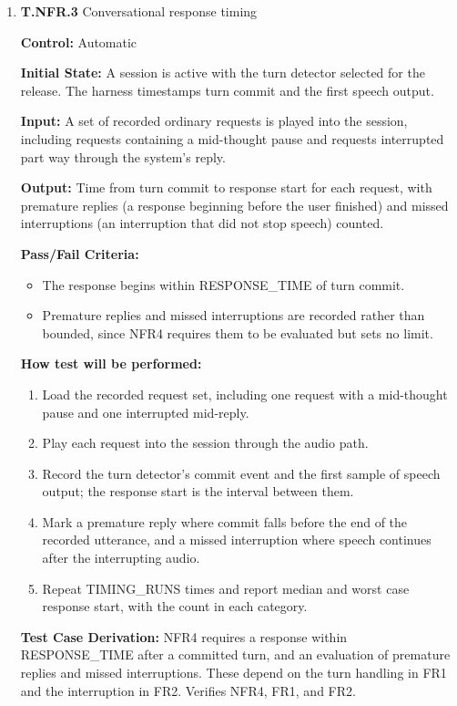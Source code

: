 \documentclass[12pt, titlepage]{article}
\begin{document}
\begin{enumerate}
\textbf{Test Case Derivation:} NFR3 requires a stop to be acknowledged within STOP\_ACK\_TIME, with the time to block new actions and the time to reconcile in-flight work measured separately. Verifies NFR3.


\item{\textbf{T.NFR.3} Conversational response timing\\}\label{test:T.NFR.3}

\textbf{Control:} Automatic

\textbf{Initial State:} A session is active with the turn detector selected for the release. The harness
timestamps turn commit and the first speech output.

\textbf{Input:} A set of recorded ordinary requests is played into the session, including requests
containing a mid-thought pause and requests interrupted part way through the system's reply.

\textbf{Output:} Time from turn commit to response start for each request, with premature replies
(a response beginning before the user finished) and missed interruptions (an interruption that did not stop
speech) counted.

\textbf{Pass/Fail Criteria:}
\begin{itemize}
  \item The response begins within RESPONSE\_TIME of turn commit.
  \item Premature replies and missed interruptions are recorded rather than bounded, since NFR4 requires them to be evaluated but sets no limit.
\end{itemize}

\textbf{How test will be performed:}

\begin{enumerate}
  \item Load the recorded request set, including one request with a mid-thought pause and one interrupted mid-reply.
  \item Play each request into the session through the audio path.
  \item Record the turn detector's commit event and the first sample of speech output; the response start is the interval between them.
  \item Mark a premature reply where commit falls before the end of the recorded utterance, and a missed interruption where speech continues after the interrupting audio.
  \item Repeat TIMING\_RUNS times and report median and worst case response start, with the count in each category.
\end{enumerate}

\textbf{Test Case Derivation:} NFR4 requires a response within RESPONSE\_TIME after a committed turn, and an evaluation of premature replies and missed interruptions. These depend on the turn handling in FR1 and the interruption in FR2. Verifies NFR4, FR1, and FR2.


\end{enumerate}
\end{document}
